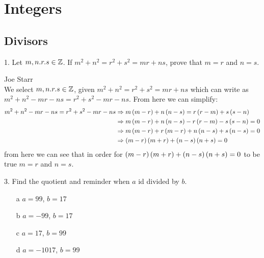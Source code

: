 \section{Integers}  
\subsection{Divisors}
\begin{mdframed}[style=darkQuesion]
1.    Let $m,n.r.s\in \mathbb{Z}$. If $m^2+n^2=r^2+s^2=mr+ns$, prove that $m=r$ and 
$n=s$.
\end{mdframed}

\begin{mdframed}[style=darkAnswer]
Joe Starr\\
We select $m,n.r.s\in \mathbb{Z}$, given $m^2+n^2=r^2+s^2=mr+ns$ which can write
as $m^2+n^2-mr-ns=r^2+s^2-mr-ns$. From here we can simplify:
\begin{align*}
m^2+n^2-mr-ns=r^2+s^2-mr-ns &\Rightarrow 
m\left(m-r\right)+n\left(n-s\right)=r\left(r-m\right)+s\left(s-n\right) \\
&\Rightarrow m\left(m-r\right)+n\left(n-s\right)-r\left(r-m\right)-s\left(s-n\right)=0 \\
&\Rightarrow m\left(m-r\right)+r\left(m-r\right)+n\left(n-s\right)+s\left(n-s\right)=0 \\
&\Rightarrow \left(m-r\right)\left(m+r\right)+\left(n-s\right)\left(n+s\right)=0 \\
\end{align*}
from here we can see that in order for $\left(m-r\right)\left(m+r\right)+\left(n-s\right)\left(n+s\right)=0$
to be true $m=r$ and $n=s$.
\end{mdframed}
\newpage
\begin{mdframed}[style=darkQuesion]
3.    Find the quotient and reminder when $a$ id divided by $b$. 
\begin{itemize}
    \item [a] {$a=99$, $b=17$}
    \item [b] {$a=-99$, $b=17$}
    \item [c] {$a=17$, $b=99$}
    \item [d] {$a=-1017$, $b=99$}
\end{itemize}

\end{mdframed}

